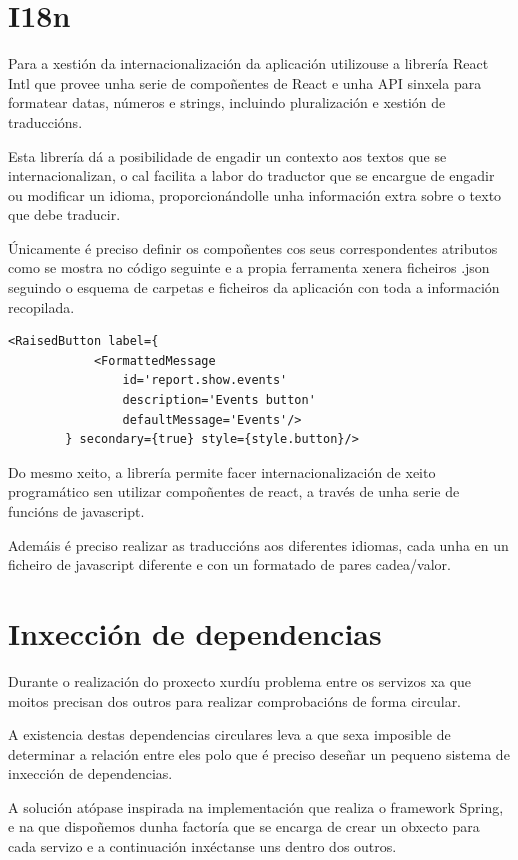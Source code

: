   \section{I18n}
  Para a xestión da internacionalización da aplicación utilizouse a librería 
React Intl que provee unha serie de compoñentes de React e unha API sinxela 
para formatear datas, números e strings, incluindo pluralización e xestión de 
traduccións.

  Esta librería dá a posibilidade de engadir un contexto aos textos que se 
internacionalizan, o cal facilita a labor do traductor que se encargue de 
engadir ou modificar un idioma, proporcionándolle unha información extra sobre 
o texto que debe traducir.

  Únicamente é preciso definir os compoñentes cos seus correspondentes 
atributos como se mostra no código seguinte e a propia ferramenta xenera 
ficheiros .json seguindo o esquema de carpetas e ficheiros da aplicación con 
toda a información recopilada.

     \begin{lstlisting}[frame=single, caption=Exemplo de internacionalización 
na label de un 
botón.]
        <RaisedButton label={
            <FormattedMessage
                id='report.show.events'
                description='Events button'
                defaultMessage='Events'/>
        } secondary={true} style={style.button}/>
    \end{lstlisting}

  Do mesmo xeito, a librería permite facer internacionalización de xeito 
programático sen utilizar compoñentes de react, a través de unha serie de 
funcións de javascript.

  Ademáis é preciso realizar as traduccións aos diferentes idiomas, cada unha 
en un ficheiro de javascript diferente e con un formatado de pares cadea/valor.

  \section{Inxección de dependencias}
  Durante o realización do proxecto xurdíu problema entre os servizos xa que 
moitos precisan dos outros para realizar comprobacións de forma circular.

  A existencia destas dependencias circulares leva a que sexa imposible de
determinar a relación entre eles polo que é preciso deseñar un pequeno sistema 
de inxección de dependencias.

  A solución atópase inspirada na implementación que realiza o framework 
Spring, e na que dispoñemos dunha factoría que se encarga de crear un obxecto 
para cada servizo e a continuación inxéctanse uns dentro dos outros.

